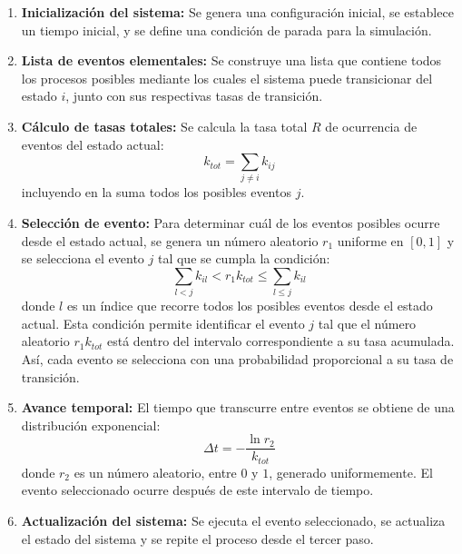 \documentclass[12pt,letterpaper,oneside]{report}
\begin{document}
\begin{enumerate}
    \item \textbf{Inicialización del sistema:} Se genera una configuración inicial, se establece un tiempo inicial,
y se define una condición de parada para la simulación.
    
    \item \textbf{Lista de eventos elementales:} Se construye una lista que contiene
todos los procesos posibles mediante los cuales el
sistema puede transicionar del estado $i$, junto con sus respectivas
tasas de transición.
    
    \item \textbf{C\'alculo de tasas totales:} Se calcula la tasa total $R$ de ocurrencia de eventos del estado actual:
    \begin{equation}
        k_{tot} = \sum_{j\neq i} k_{ij}
        \label{eq:10}
    \end{equation}
    incluyendo en la suma todos los posibles eventos $j$.
    
    \item \textbf{Selecci\'on de evento:} Para determinar cu\'al de los eventos posibles ocurre desde el estado actual, se genera un número aleatorio $r_1$ uniforme en $[0,1]$ y se selecciona el evento $j$ tal que se cumpla la condición:
    \begin{equation}
        \sum_{l < j} k_{il} < r_1 k_{tot} \leq \sum_{l \leq j} k_{il}
        \label{eq:11}
    \end{equation}
    donde $l$ es un índice que recorre todos los posibles eventos desde el estado actual. Esta condición permite
identificar el evento $j$ tal que el número aleatorio $r_1k_{tot}$ está dentro del intervalo correspondiente a su tasa
acumulada. Así, cada evento se selecciona con
una probabilidad proporcional a su tasa de transición.
    
    \item \textbf{Avance temporal:} El tiempo que transcurre entre eventos se obtiene de una distribuci\'on exponencial:
    \begin{equation}
        \Delta t = -\frac{\ln r_2}{k_{tot}}
        \label{eq:12}
    \end{equation}
    donde $r_2$ es un número aleatorio, entre $0$ y $1$, generado uniformemente. El evento seleccionado ocurre despu\'es de este intervalo de tiempo.
    
    \item \textbf{Actualizaci\'on del sistema:} Se ejecuta el evento seleccionado,
se actualiza el estado del sistema y se repite el
proceso desde el tercer paso.
\end{enumerate}\\
\end{document}
